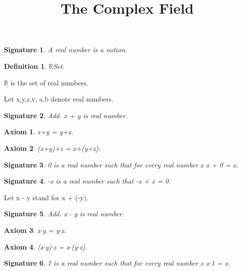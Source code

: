 \documentclass{article}
\newenvironment{forthel}{\begin{leftbar}}{\end{leftbar}}
\newtheorem{axiom}{Axiom}
\newtheorem{definition}{Definition}
\newtheorem{signature}{Signature}
\begin{document}
\title{The Complex Field}

\maketitle

\begin{forthel}
[set/-s] [element/-s] [number/-s]

\begin{signature} A real number is a notion.

\end{signature}

\begin{definition} $\mathbb{R}$Set.

\end{definition}
$\mathbb{R}$ is the set of real numbers.

Let x,y,z,v, a,b denote real numbers.



\begin{signature} Add. x + y is real number.

\end{signature}
\begin{axiom} x+y = y+x.

\end{axiom}
\begin{axiom} (x+y)+z = x+(y+z).

\end{axiom}
\begin{signature} 0 is a real number such that for every real number x x + 0 = x.

\end{signature}
\begin{signature} -x is a real number such that -x + x = 0.

\end{signature}

Let x - y stand for x + (-y).

\begin{signature} Add. x $\cdot$ y is real number.

\end{signature}
\begin{axiom} x$\cdot$y = y$\cdot$x.

\end{axiom}
\begin{axiom} (x$\cdot$y)$\cdot$z = x$\cdot$(y$\cdot$z).

\end{axiom}
\begin{signature} 1 is a real number such that for every real number x x$\cdot$1 = x.


\end{signature}
\end{forthel}
\end{document}
